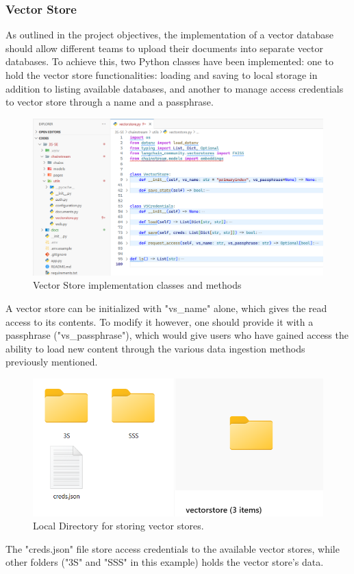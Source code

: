 \subsubsection{Vector Store}
As outlined in the project objectives, the implementation of a vector database should allow different teams to upload their documents into separate vector databases.\newline
To achieve this, two Python classes have been implemented: one to hold the vector store functionalities: loading and saving to local storage in addition to listing available databases, and another to manage access credentials to vector store through a name and a passphrase.
\begin{figure}[htbp]
    \centering
    \includegraphics[width=\linewidth]{./figures/vectorstore-implementation.png}
    \caption{Vector Store implementation classes and methods}
\end{figure}\newline
A vector store can be initialized with "vs\_name" alone, which gives the read access to its contents. To modify it however, one should provide it with a passphrase ("vs\_passphrase"), which would give users who have gained access the ability to load new content through the various data ingestion methods previously mentioned.\newpage
\begin{figure}[htbp]
    \centering
    \includegraphics[width=.8\linewidth]{./figures/vectorstore-local-dir.png}
    \caption{Local Directory for storing vector stores.}
\end{figure}
The "creds.json" file store access credentials to the available vector stores, while other folders ("3S" and "SSS" in this example) holds the vector store's data.
